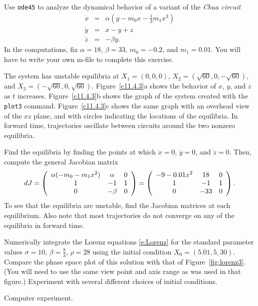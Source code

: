 \documentclass{ximera}
\begin{document}
\begin{exercise} \label{c11.4.3}
Use {\tt ode45} to analyze the dynamical behavior of a variant of the 
{\em Chua circuit}
\begin{eqnarray*}
  \dot{x} &=& \alpha\left(y-m_0x-\frac{1}{3}m_1x^3\right) \\
  \dot{y} &=& x-y+z \\
  \dot{z} &=& - \beta y.
\end{eqnarray*}
In the computations, fix $\alpha=18$, $\beta=33$, $m_0=-0.2$, and $m_1=0.01$.
You will have to write your own m-file to complete this exercise. 

\begin{solution}

\ans The system has unstable equilibria at $X_1 = (0,0,0)$,
$X_2 = (\sqrt{60},0, -\sqrt{60})$, and $X_3 = (-\sqrt{60},0,\sqrt{60})$.
Figure~\ref{c11.4.3}a shows the behavior of $x$, $y$, and $z$ as $t$
increases.  Figure~\ref{c11.4.3}b shows the graph of the system created
with the {\tt plot3} command.  Figure~\ref{c11.4.3}c shows the same graph
with an overhead view of the $xz$ plane, and with circles indicating the
locations of the equilibria.  In forward time, trajectories oscillate
between circuits around the two nonzero equilibria.

\soln Find the equilibria by finding the points at which $\dot{x} = 0$,
$\dot{y} = 0$, and $\dot{z} = 0$.  Then, compute the general Jacobian
matrix
\[
dJ = \left(\begin{array}{ccc} \alpha(-m_0 - m_1x^2) & \alpha & 0 \\ 1 & -1 & 1 \\ 0 & -\beta & 0\end{array}\right)
= \left(\begin{array}{ccc} -9 - 0.01x^2 & 18 & 0 \\ 1 & -1 & 1 \\ 0 & -33 & 0\end{array}\right).
\]
To see that the equilibria are unstable, find the Jacobian matrices at
each equilibrium.  Also note that most trajectories do not converge on
any of the equilibria in forward time.

\begin{figure}[htb]
                       \centerline{%
			\hspace{0.5in}
			\hspace{0.3in}
                       }
\end{figure}


\end{solution}
\end{exercise}

\begin{exercise} \label{c11.4.3a}
Numerically integrate the Lorenz equations \eqref{e:Lorenz} for the standard 
parameter values $\sigma=10$, $\beta=\frac{8}{3}$, $\rho=28$ using the initial 
condition $X_0 =(5.01,5,30)$.  Compare the phase space plot of this solution 
with that of Figure~\ref{fig:lorenz3}.  (You will need to use the same view
point and axis range as was used in that figure.)  Experiment with several 
different choices of initial conditions.

\begin{solution}
Computer experiment.

\end{solution}
\end{exercise}
\end{document}
